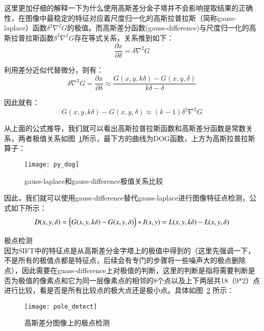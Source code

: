 \begin{compactenum}
这里更加仔细的解释一下为什么使用高斯差分金子塔并不会影响提取结果的正确性，在图像中最稳定的特征对应着尺度归一化的高斯拉普拉斯（简称gauss-laplace）函数${\delta}^2{\nabla}^2{G}$的极值。而高斯差分函数(gauss-difference)与尺度归一化的高斯拉普拉斯函数${\delta}^2{\nabla}^2{G}$存在等式关系，关系推到如下：
\begin{equation}\label{dog_1}
\frac{\partial{x}}{\partial{\delta}}=\delta\nabla^2G
\end{equation}

利用差分近似代替微分，则有：
\begin{equation}\label{dog_2}
\delta\nabla^2G=\frac{\partial{x}}{\partial{\delta}}\approx\frac{G(x,y,k\delta)-G(x,y,\delta)}{k\delta-\delta}
\end{equation}

因此就有：
\begin{equation}\label{dog_3}
G(x,y,k\delta)-G(x,y,\delta)\approx(k-1)\delta^2\nabla^2G
\end{equation}

从上面的公式推导，我们就可以看出高斯拉普拉斯函数和高斯差分函数是常数关系，两者极值关系如图~\ref{fig:py_dog}所示，最下方的曲线为DOG函数，上方为高斯拉普拉斯算子：
\begin{figure}[htp]
\centering
\texttt{[image: py\_dog]}
\caption{gauss-laplace和gauss-difference极值关系比较}
\label{fig:py_dog}
\end{figure}

因此，我们就可以使用gauss-difference替代gauss-laplace进行图像特征点检测，公式如下所示：
\begin{equation}\label{dog_detect}
D(x,y,\delta)=\Bigl(G(x,y,k\delta)-G(x,y,\delta)\Bigr)*I(x,y)=L(x,y,k\delta)-L(x,y,\delta)
\end{equation}

\item 极点检测\\因为SIFT中的特征点是从高斯差分金字塔上的极值中得到的（这里先强调一下，不是所有的极值点都是特征点，后续会有专门的步骤将一些噪声大的极点删除点），因此需要在guass-difference上对极值的判断，这里的判断是指将需要判断是否为极值的像素点和它为同一层像素点的相邻的8个点以及上下两层共18（9*2）点进行比较，看是否是所有比较点的极大点还是极小点。具体如图~\ref{fig:pole_detect} 所示：
\begin{figure}[htp]
\centering
\texttt{[image: pole\_detect]}
\caption{高斯差分图像上的极点检测}
\label{fig:pole_detect}
\end{figure}


\end{compactenum}
